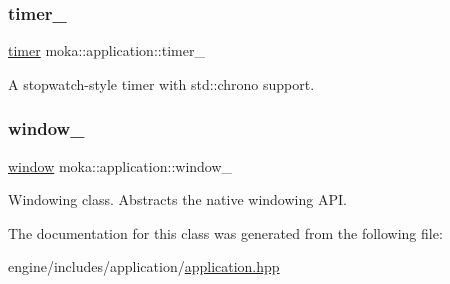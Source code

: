\subsubsection{\texorpdfstring{timer\_}{timer\_}}
{\footnotesize\ttfamily \mbox{\hyperlink{classmoka_1_1timer}{timer}} moka\+::application\+::timer\+\_\+\hspace{0.3cm}{\ttfamily [protected]}}

A stopwatch-\/style timer with std\+::chrono support. \mbox{\label{classmoka_1_1application_a13c9e8af519e045299e8993a0a928731}} 
\subsubsection{\texorpdfstring{window\_}{window\_}}
{\footnotesize\ttfamily \mbox{\hyperlink{classmoka_1_1window}{window}} moka\+::application\+::window\+\_\+\hspace{0.3cm}{\ttfamily [protected]}}

Windowing class. Abstracts the native windowing A\+PI. 

The documentation for this class was generated from the following file\+:\begin{DoxyCompactItemize}
\item 
engine/includes/application/\mbox{\hyperlink{application_8hpp}{application.\+hpp}}\end{DoxyCompactItemize}
